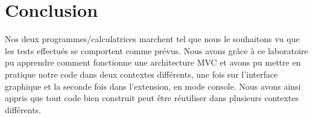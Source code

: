 \documentclass[12pt]{report}
\begin{document}
    \section*{Conclusion}
        Nos deux programmes/calculatrices marchent tel que nous le souhaitons vu que les tests effectués se comportent
        comme prévus. Nous avons grâce à ce laboratoire pu apprendre comment fonctionne une architecture MVC et avons pu
        mettre en pratique notre code dans deux contextes différents, une fois sur l'interface graphique et la seconde
        fois dans l'extension, en mode console. \newline Nous avons ainsi appris que tout code bien construit peut être
        réutiliser dans plusieurs contextes différents.
\end{document}

